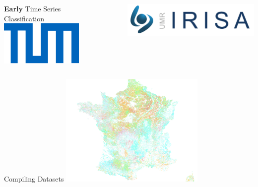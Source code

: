 \documentclass[%
  aspectratio=169,
  9pt,
  USenglish,
  titlegraphic, %
  affiliationintitlepagehead,
  affiliation,
]{beamer}
\begin{document}



{
	\begin{frame}[plain]
	\vfill
		\Huge\color{tumbluedark}
		\begin{columns}
			\vspace{4em}
			
			\hfill \textbf{Early} Time Series \\\hfill Classification
			\includegraphics[width=4cm]{images/TUM-blue}
			
			\vspace{1em}
			\includegraphics[width=7cm]{images/Irisa}
		\end{columns}

	\vfill
\end{frame}
}




{
	\begin{frame}[plain]
	\vfill
	\begin{center}
		\Huge\color{white}
		Compiling Datasets
		\includegraphics[width=7cm]{images/France_white}
	\end{center}
	
	\vfill
\end{frame}
}
\end{document}
